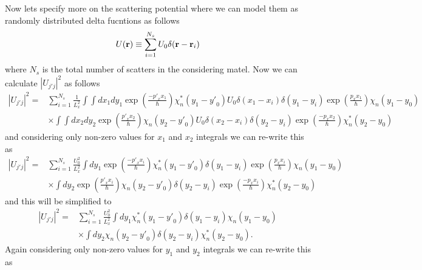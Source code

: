 \noindent
Now lets specify more on the scattering potential where we can model them as randomly distributed delta fucntions as follows
\begin{equation} \label{2.35}
    U(\vb{r}) \equiv \sum_{i=1}^{N_s} U_0 \delta(\vb{r} - \vb{r}_i)
\end{equation}
where $N_s$ is the total number of scatters in the considering matel. Now we can calculate $|U_{j'j}|^2$ as follows
\begin{equation} \label{2.36}
  \begin{aligned}
    |U_{j'j}|^2 = &
    \sum_{i =1}^{N_s}
    \frac{1}{L_x^2}
    \int \int  dx_1 dy_1
      \exp(\frac{-{p'}_x x_1}{\hbar})
      \chi_n^* (y_1 - {y'}_0)
      U_0 \delta(x_1-x_i)\delta(y_1-y_i)
      \exp(\frac{{p}_x x_1}{\hbar})
      \chi_n (y_1 - {y}_0) \\
    & \times
    \int \int  dx_2 dy_2
      \exp(\frac{{p'}_x x_2}{\hbar})
      \chi_n (y_2 - {y'}_0)
      U_0 \delta(x_2 - x_i)\delta(y_2 - y_i)
      \exp(\frac{-{p}_x x_2}{\hbar})
      \chi_n^* (y_2 - {y}_0)
  \end{aligned}
\end{equation}
and considering only non-zero values for $x_1$ and $x_2$ integrals we can re-write this as
\begin{equation} \label{2.37}
  \begin{aligned}
    |U_{j'j}|^2 = &
    \sum_{i =1}^{N_s}
    \frac{U_0^2}{L_x^2}
    \int dy_1
      \exp(\frac{-{p'}_x x_i}{\hbar})
      \chi_n^* (y_1 - {y'}_0)
      \delta(y_1-y_i)
      \exp(\frac{{p}_x x_i}{\hbar})
      \chi_n (y_1 - {y}_0) \\
    & \times
    \int dy_2
      \exp(\frac{{p'}_x x_i}{\hbar})
      \chi_n (y_2 - {y'}_0)
      \delta(y_2 - y_i)
      \exp(\frac{-{p}_x x_i}{\hbar})
      \chi_n^* (y_2 - {y}_0)
  \end{aligned}
\end{equation}
and this will be simplified to
\begin{equation} \label{2.38}
  \begin{aligned}
    |U_{j'j}|^2 = &
    \sum_{i =1}^{N_s}
    \frac{U_0^2}{L_x^2}
    \int dy_1
      \chi_n^* (y_1 - {y'}_0)
      \delta(y_1-y_i)
      \chi_n (y_1 - {y}_0) \\
    & \times
    \int dy_2
      \chi_n (y_2 - {y'}_0)
      \delta(y_2 - y_i)
      \chi_n^* (y_2 - {y}_0).
  \end{aligned}
\end{equation}
Again considering only non-zero values for $y_1$ and $y_2$ integrals we can re-write this as
